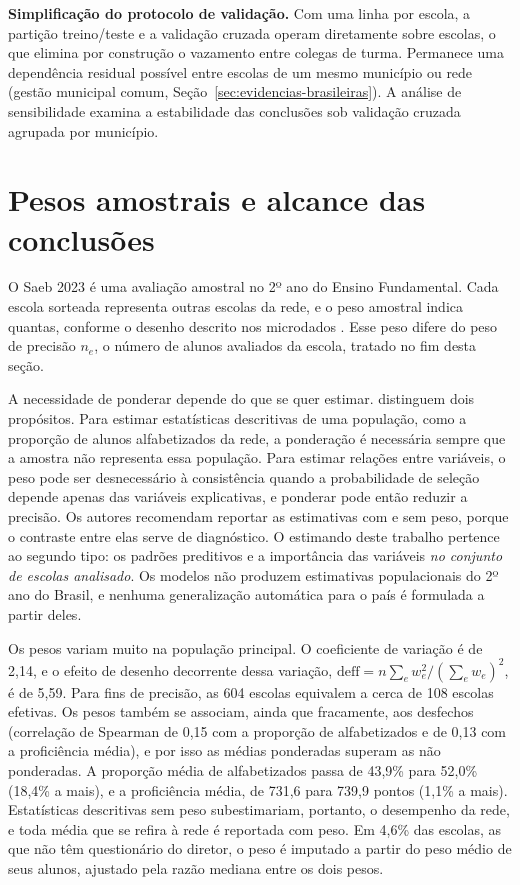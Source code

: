 \textbf{Simplificação do protocolo de validação.} Com uma linha por escola,
a partição treino/teste e a validação cruzada operam diretamente sobre
escolas, o que elimina por construção o vazamento entre colegas de turma.
Permanece
uma dependência residual possível entre escolas de um mesmo município ou
rede (gestão municipal comum, Seção~\ref{sec:evidencias-brasileiras}). A
análise de sensibilidade examina a estabilidade das conclusões sob
validação cruzada agrupada por município.

\section{Pesos amostrais e alcance das conclusões}
\label{sec:pesos}

O Saeb 2023 é uma avaliação amostral no 2º ano do Ensino Fundamental. Cada
escola sorteada representa outras escolas da rede, e o peso amostral indica
quantas, conforme o desenho descrito nos microdados \cite{inep2026microdados}.
Esse peso difere do peso de precisão $n_e$, o número de alunos avaliados da
escola, tratado no fim desta seção.

A necessidade de ponderar depende do que se quer estimar.
 distinguem dois propósitos. Para estimar
estatísticas descritivas de uma população, como a proporção de alunos
alfabetizados da rede, a ponderação é necessária sempre que a amostra não
representa essa população. Para estimar relações entre variáveis, o peso
pode ser desnecessário à consistência quando a probabilidade de seleção
depende apenas das variáveis explicativas, e ponderar pode então reduzir a
precisão. Os autores recomendam reportar as estimativas com e sem peso,
porque o contraste entre elas serve de diagnóstico. O estimando deste
trabalho pertence ao segundo tipo: os padrões preditivos e a importância das
variáveis \emph{no conjunto de escolas analisado}. Os modelos não produzem
estimativas populacionais do 2º ano do Brasil, e nenhuma generalização
automática para o país é formulada a partir deles.

Os pesos variam muito na população principal. O coeficiente de variação é
de 2,14, e o efeito de desenho decorrente dessa variação,
$\text{deff} = n\sum_e w_e^2 \big/ \left(\sum_e w_e\right)^2$, é de 5,59.
Para fins de precisão, as 604 escolas equivalem a cerca de 108 escolas
efetivas. Os pesos também se associam, ainda que fracamente, aos desfechos
(correlação de Spearman de 0,15 com a proporção de alfabetizados e de 0,13
com a proficiência média), e por isso as médias ponderadas superam as não
ponderadas. A proporção média de alfabetizados passa de 43,9\% para 52,0\%
(18,4\% a mais), e a proficiência média, de 731,6 para 739,9 pontos (1,1\%
a mais). Estatísticas descritivas sem peso subestimariam, portanto, o
desempenho da rede, e toda média que se refira à rede é reportada com peso.
Em 4,6\% das escolas, as que não têm questionário do diretor, o peso é imputado a
partir do peso médio de seus alunos, ajustado pela razão mediana entre os
dois pesos.

